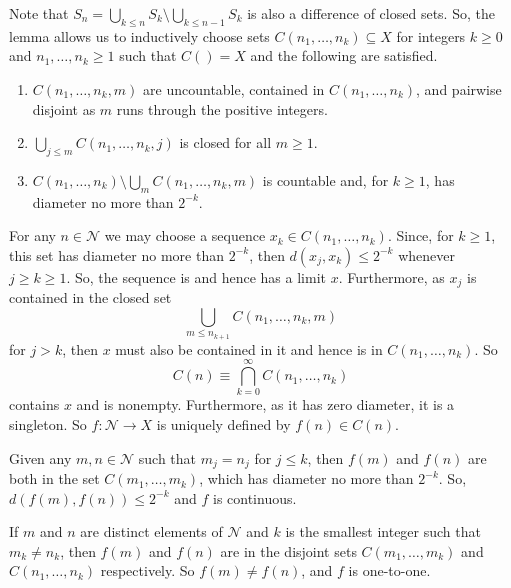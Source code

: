 \documentclass[12pt]{article}
\begin{document}
Note that $S_n=\bigcup_{k\le n}S_k\setminus\bigcup_{k\le n-1}S_k$ is also a difference of closed sets. So, the lemma allows us to inductively choose sets $C(n_1,\ldots,n_k)\subseteq X$ for integers $k\ge 0$ and $n_1,\ldots,n_k\ge 1$ such that $C()=X$ and the following are satisfied.
\begin{enumerate}
\item $C(n_1,\ldots,n_k,m)$ are uncountable, contained in $C(n_1,\ldots,n_k)$, and pairwise disjoint as $m$ runs through the positive integers.
\item $\bigcup_{j\le m}C(n_1,\ldots,n_k,j)$ is closed for all $m\ge 1$.
\item $C(n_1,\ldots,n_k)\setminus\bigcup_mC(n_1,\ldots,n_k,m)$ is countable and, for $k\ge 1$, has diameter no more than $2^{-k}$.
\end{enumerate}

For any $n\in\mathcal{N}$ we may choose a sequence $x_k\in C(n_1,\ldots,n_k)$. Since, for $k\ge 1$, this set has diameter no more than $2^{-k}$, then $d(x_j,x_k)\le 2^{-k}$ whenever $j\ge k\ge 1$. So, the sequence is  and hence has a limit $x$.
Furthermore, as $x_j$ is contained in the closed set
\begin{equation*}
\bigcup_{m\le n_{k+1}}C(n_1,\ldots,n_k,m)
\end{equation*}
for $j>k$, then $x$ must also be contained in it and hence is in $C(n_1,\ldots,n_k)$. So
\begin{equation*}
C(n)\equiv\bigcap_{k=0}^\infty C(n_1,\ldots,n_k)
\end{equation*}
contains $x$ and is nonempty. Furthermore, as it has zero diameter, it is a singleton. So $f\colon\mathcal{N}\rightarrow X$ is uniquely defined by $f(n)\in C(n)$.


Given any $m,n\in \mathcal{N}$ such that $m_j=n_j$ for $j\le k$, then $f(m)$ and $f(n)$ are both in the set $C(m_1,\ldots,m_k)$, which has diameter no more than $2^{-k}$. So, $d(f(m),f(n))\le 2^{-k}$ and $f$ is continuous.

If $m$ and $n$ are distinct elements of $\mathcal{N}$ and $k$ is the smallest integer such that $m_k\not= n_k$, then $f(m)$ and $f(n)$ are in the disjoint sets $C(m_1,\ldots,m_k)$ and $C(n_1,\ldots,n_k)$ respectively. So $f(m)\not= f(n)$, and $f$ is one-to-one.
\end{document}
